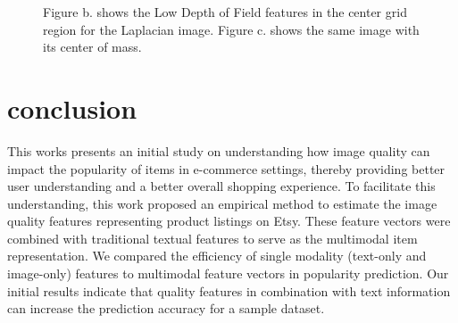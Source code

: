 \documentclass[conference,a4paper]{IEEEtran}
\begin{document}
\begin{figure}[t!]
  \centering
  \caption{
  Figure b. shows the Low Depth of Field features in the center grid region for the Laplacian image.  Figure c. shows the same image with its center of mass.
  }
  \label{fig:lowdof}
\end{figure}




\section{conclusion}
\label{sec:conclusion}
This works presents an initial study on understanding how image quality
can impact the popularity of items in e-commerce settings, thereby providing better user
understanding and a better overall shopping experience. To facilitate
this understanding, this work proposed an empirical method to
estimate the image quality features representing product listings
on Etsy. These feature vectors were combined with traditional textual features to serve as the multimodal item representation. We compared the efficiency of single modality (text-only and image-only) features to multimodal feature vectors in popularity prediction. Our initial results indicate that quality features in combination with text information can increase the prediction accuracy for a sample dataset.



%

\end{document}
